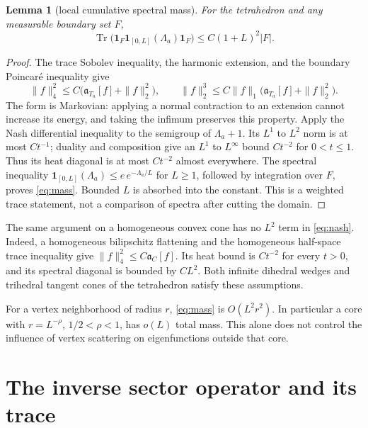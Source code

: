 \documentclass[11pt]{amsart}
\numberwithin{equation}{section}
\newtheorem{lemma}[theorem]{Lemma}
\theoremstyle{remark}
\newcommand{\Tr}{\operatorname{Tr}}
\newcommand{\one}{\mathbf{1}}
\newcommand{\fa}{\mathfrak{a}}
\begin{document}
\begin{lemma}[local cumulative spectral mass]\label{lem:mass}
For the tetrahedron and any measurable boundary set $F$,
\begin{equation}\label{eq:mass}
\Tr\big(\one_F\one_{[0,L]}(\Lambda_a)\one_F\big)\le C(1+L)^2|F| .
\end{equation}
\end{lemma}

\begin{proof}
The trace Sobolev inequality, the harmonic extension, and the boundary Poincar\'e inequality give
\begin{equation}\label{eq:nash}
\|f\|_4^2\le C\big(\fa_{T_a}[f]+\|f\|_2^2\big),\qquad \|f\|_2^3\le C\|f\|_1\big(\fa_{T_a}[f]+\|f\|_2^2\big).
\end{equation}
The form is Markovian: applying a normal contraction to an extension cannot increase its energy, and taking the infimum preserves this property. Apply the Nash differential inequality to the semigroup of $\Lambda_a+1$. Its $L^1$ to $L^2$ norm is at most $Ct^{-1}$; duality and composition give an $L^1$ to $L^\infty$ bound $Ct^{-2}$ for $0<t\le1$. Thus its heat diagonal is at most $Ct^{-2}$ almost everywhere. The spectral inequality $\one_{[0,L]}(\Lambda_a)\le e\,e^{-\Lambda_a/L}$ for $L\ge1$, followed by integration over $F$, proves \eqref{eq:mass}. Bounded $L$ is absorbed into the constant. This is a weighted trace statement, not a comparison of spectra after cutting the domain.
\end{proof}

The same argument on a homogeneous convex cone has no $L^2$ term in \eqref{eq:nash}. Indeed, a homogeneous bilipschitz flattening and the homogeneous half-space trace inequality give $\|f\|_4^2\le C\fa_C[f]$. Its heat bound is $Ct^{-2}$ for every $t>0$, and its spectral diagonal is bounded by $CL^2$. Both infinite dihedral wedges and trihedral tangent cones of the tetrahedron satisfy these assumptions.

For a vertex neighborhood of radius $r$, \eqref{eq:mass} is $O(L^2r^2)$. In particular a core with $r=L^{-\rho}$, $1/2<\rho<1$, has $o(L)$ total mass. This alone does not control the influence of vertex scattering on eigenfunctions outside that core.

\section{The inverse sector operator and its trace}
\end{document}
